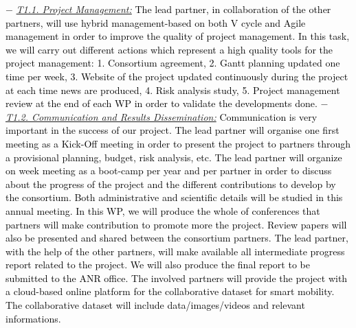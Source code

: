 \documentclass[a4paper,11pt]{article}
\begin{document}
\begin{itemize}[leftmargin=.2in,noitemsep,nolistsep]

{
\subitem$-$ \underline{\it T1.1. Project Management:}
\textcolor{black}{The lead partner, in collaboration of the other partners, will use hybrid management-based on both V cycle and Agile management in order to improve the quality of project management. In this task, we will carry out different actions which represent a high quality tools for the project management: 1. Consortium agreement, 2. Gantt planning updated one time per week, 3. Website of the project updated continuously during the project at each time news are produced, 4. Risk analysis study, 5. Project management review at the end of each WP in order to validate the developments done.%
}
\subitem$-$  \underline{\it T1.2. Communication and Results Dissemination:}
\textcolor{black}{Communication is very important in the success of our project. 
The lead partner will organise one first meeting as a Kick-Off meeting in order to present the project to partners through a provisional planning, budget, risk analysis, etc. The lead partner will organize on week meeting as a boot-camp per year and per partner in order to discuss about the progress of the project and the different contributions to develop by the consortium. Both administrative and scientific details will be studied in this annual meeting. In this WP, we will produce the whole of conferences that partners will make contribution to promote more the project. Review papers will also be presented and shared between the consortium partners. The lead partner, with the help of the other partners, will make available all intermediate progress report related to the project. We will also produce the final report to be submitted to the ANR office. The involved partners will provide the project with a cloud-based online platform for the collaborative dataset for smart mobility. The collaborative dataset will include data/images/videos and relevant informations. 
}}
\end{itemize}
\end{document}
